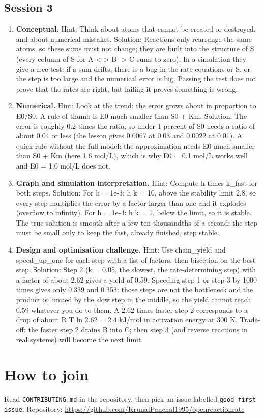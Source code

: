 \documentclass[11pt,a4paper]{article}
\begin{document}
\subsection*{Session 3}
\begin{enumerate}[nosep]
\item \textbf{Conceptual.} Hint: Think about atoms that cannot be created or destroyed, and about numerical mistakes. Solution: Reactions only rearrange the same atoms, so these sums must not change; they are built into the structure of S (every column of S for A \textless{}-\textgreater{} B -\textgreater{} C sums to zero). In a simulation they give a free test: if a sum drifts, there is a bug in the rate equations or S, or the step is too large and the numerical error is big. Passing the test does not prove that the rates are right, but failing it proves something is wrong.
\item \textbf{Numerical.} Hint: Look at the trend: the error grows about in proportion to E0/S0. A rule of thumb is E0 much smaller than S0 + Km. Solution: The error is roughly 0.2 times the ratio, so under 1 percent of S0 needs a ratio of about 0.04 or less (the lesson gives 0.0067 at 0.03 and 0.0022 at 0.01). A quick rule without the full model: the approximation needs E0 much smaller than S0 + Km (here 1.6 mol/L), which is why E0 = 0.1 mol/L works well and E0 = 1.0 mol/L does not.
\item \textbf{Graph and simulation interpretation.} Hint: Compute h times k\_fast for both steps. Solution: For h = 1e-3: h k = 10, above the stability limit 2.8, so every step multiplies the error by a factor larger than one and it explodes (overflow to infinity). For h = 1e-4: h k = 1, below the limit, so it is stable. The true solution is smooth after a few ten-thousandths of a second; the step must be small only to keep the fast, already finished, step stable.
\item \textbf{Design and optimisation challenge.} Hint: Use chain\_yield and speed\_up\_one for each step with a list of factors, then bisection on the best step. Solution: Step 2 (k = 0.05, the slowest, the rate-determining step) with a factor of about 2.62 gives a yield of 0.59. Speeding step 1 or step 3 by 1000 times gives only 0.339 and 0.353: those steps are not the bottleneck and the product is limited by the slow step in the middle, so the yield cannot reach 0.59 whatever you do to them. A 2.62 times faster step 2 corresponds to a drop of about R T ln 2.62 = 2.4 kJ/mol in activation energy at 300 K. Trade-off: the faster step 2 drains B into C; then step 3 (and reverse reactions in real systems) will become the next limit.
\end{enumerate}

\section{How to join}
Read \texttt{CONTRIBUTING.md} in the repository, then pick an issue labelled \texttt{good first issue}. Repository: \url{https://github.com/KrunalPanchal1995/openreactionrate}
\end{document}
